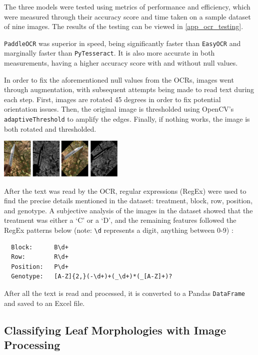 \documentclass[final,5p,times,twocolumn,authoryear]{elsarticle}
\begin{document}
The three models were tested using metrics of performance and efficiency, which were measured through their accuracy score and time taken on a sample dataset of nine images. The results of the testing can be viewed in \ref{app_ocr_testing}.

\verb|PaddleOCR| was superior in speed, being significantly faster than \verb|EasyOCR| and marginally faster than \verb|PyTesseract|. It is also more accurate in both measurements, having a higher accuracy score with and without null values.

In order to fix the aforementioned null values from the OCRs, images went through augmentation, with subsequent attempts being made to read text during each step. First, images are rotated 45 degrees in order to fix potential orientation issues. Then, the original image is thresholded using OpenCV's \verb|adaptiveThreshold| to amplify the edges. Finally, if nothing works, the image is both rotated and thresholded.

\begin{center}
    \includegraphics[width=0.45\textwidth]{images/step1_pipeline.png}
\end{center}

After the text was read by the OCR, regular expressions (RegEx) were used to find the precise details mentioned in the dataset: treatment, block, row, position, and genotype. A subjective analysis of the images in the dataset showed that the treatment was either a ‘C’ or a ‘D’, and the remaining features followed the RegEx patterns below (note: \verb|\d| represents a digit, anything between 0-9) :

\begin{verbatim}
  Block:      B\d+
  Row:        R\d+
  Position:   P\d+
  Genotype:   [A-Z]{2,}(-\d+)+(_\d+)*(_[A-Z]+)?
\end{verbatim}

After all the text is read and processed, it is converted to a Pandas \verb|DataFrame| and saved to an Excel file.

\subsection{Classifying Leaf Morphologies with Image Processing}
\label{step_2}
\end{document}

